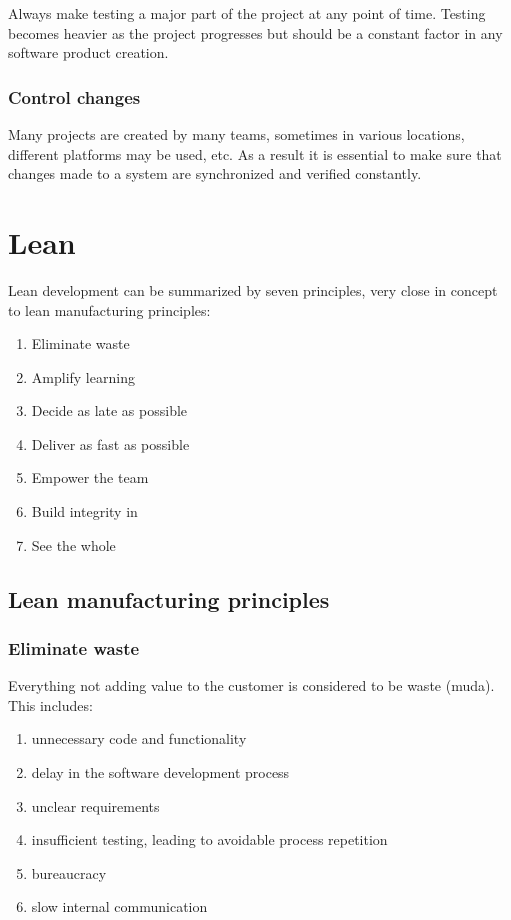 Always make testing a major part of the project at any point of time. Testing becomes heavier as the project progresses but should be a constant factor in any software product creation.

\subsubsection{Control changes}

Many projects are created by many teams, sometimes in various locations, different platforms may be used, etc. As a result it is essential to make sure that changes made to a system are synchronized and verified constantly.

\section{Lean}

Lean development can be summarized by seven principles, very close in concept to lean manufacturing principles:
\begin{enumerate}
\item Eliminate waste
\item Amplify learning
\item Decide as late as possible
\item Deliver as fast as possible
\item Empower the team
\item Build integrity in
\item See the whole
\end{enumerate}

\subsection{Lean manufacturing principles}

\subsubsection{Eliminate waste}
Everything not adding value to the customer is considered to be waste (muda). This includes:
\begin{enumerate}
\item unnecessary code and functionality
\item delay in the software development process
\item unclear requirements
\item insufficient testing, leading to avoidable process repetition
\item bureaucracy
\item slow internal communication
\end{enumerate}


